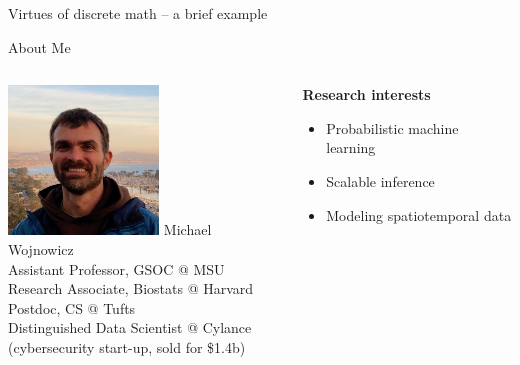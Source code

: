 \documentclass[10pt]{beamer}
\begin{document}
\begin{frame}[standout]
Virtues of discrete math -- a brief example
\end{frame}



\begin{frame}{About Me}
    \begin{columns}[T,onlytextwidth]
        \begin{column}{0.58\textwidth}
            \centering
        	\includegraphics[width=4cm]{images/profile.jpeg}
            \vfill
            Michael Wojnowicz \\
            Assistant Professor, GSOC @ MSU \\
            Research Associate, Biostats @ Harvard \\
            Postdoc, CS @ Tufts  \\
			Distinguished Data Scientist @ Cylance \\
			(cybersecurity start-up, sold for \$1.4b) 
        \end{column}
        \begin{column}{0.38\textwidth}
            \centering
            \vspace{0.5in}\textbf{Research interests}
            \begin{itemize}
            \item Probabilistic machine learning
            \item Scalable inference
            \item Modeling spatiotemporal data	
            \end{itemize}
%           
        \end{column}
    \end{columns}
\end{frame}
\end{document}

